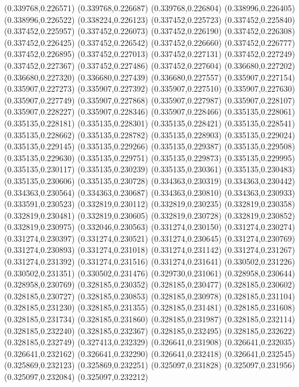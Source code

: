 (0.339768,0.226571)
(0.339768,0.226687)
(0.339768,0.226804)
(0.338996,0.226405)
(0.338996,0.226522)
(0.338224,0.226123)
(0.337452,0.225723)
(0.337452,0.225840)
(0.337452,0.225957)
(0.337452,0.226073)
(0.337452,0.226190)
(0.337452,0.226308)
(0.337452,0.226425)
(0.337452,0.226542)
(0.337452,0.226660)
(0.337452,0.226777)
(0.337452,0.226895)
(0.337452,0.227013)
(0.337452,0.227131)
(0.337452,0.227249)
(0.337452,0.227367)
(0.337452,0.227486)
(0.337452,0.227604)
(0.336680,0.227202)
(0.336680,0.227320)
(0.336680,0.227439)
(0.336680,0.227557)
(0.335907,0.227154)
(0.335907,0.227273)
(0.335907,0.227392)
(0.335907,0.227510)
(0.335907,0.227630)
(0.335907,0.227749)
(0.335907,0.227868)
(0.335907,0.227987)
(0.335907,0.228107)
(0.335907,0.228227)
(0.335907,0.228346)
(0.335907,0.228466)
(0.335135,0.228061)
(0.335135,0.228181)
(0.335135,0.228301)
(0.335135,0.228421)
(0.335135,0.228541)
(0.335135,0.228662)
(0.335135,0.228782)
(0.335135,0.228903)
(0.335135,0.229024)
(0.335135,0.229145)
(0.335135,0.229266)
(0.335135,0.229387)
(0.335135,0.229508)
(0.335135,0.229630)
(0.335135,0.229751)
(0.335135,0.229873)
(0.335135,0.229995)
(0.335135,0.230117)
(0.335135,0.230239)
(0.335135,0.230361)
(0.335135,0.230483)
(0.335135,0.230606)
(0.335135,0.230728)
(0.334363,0.230319)
(0.334363,0.230442)
(0.334363,0.230564)
(0.334363,0.230687)
(0.334363,0.230810)
(0.334363,0.230933)
(0.333591,0.230523)
(0.332819,0.230112)
(0.332819,0.230235)
(0.332819,0.230358)
(0.332819,0.230481)
(0.332819,0.230605)
(0.332819,0.230728)
(0.332819,0.230852)
(0.332819,0.230975)
(0.332046,0.230563)
(0.331274,0.230150)
(0.331274,0.230274)
(0.331274,0.230397)
(0.331274,0.230521)
(0.331274,0.230645)
(0.331274,0.230769)
(0.331274,0.230893)
(0.331274,0.231018)
(0.331274,0.231142)
(0.331274,0.231267)
(0.331274,0.231392)
(0.331274,0.231516)
(0.331274,0.231641)
(0.330502,0.231226)
(0.330502,0.231351)
(0.330502,0.231476)
(0.329730,0.231061)
(0.328958,0.230644)
(0.328958,0.230769)
(0.328185,0.230352)
(0.328185,0.230477)
(0.328185,0.230602)
(0.328185,0.230727)
(0.328185,0.230853)
(0.328185,0.230978)
(0.328185,0.231104)
(0.328185,0.231230)
(0.328185,0.231355)
(0.328185,0.231481)
(0.328185,0.231608)
(0.328185,0.231734)
(0.328185,0.231860)
(0.328185,0.231987)
(0.328185,0.232114)
(0.328185,0.232240)
(0.328185,0.232367)
(0.328185,0.232495)
(0.328185,0.232622)
(0.328185,0.232749)
(0.327413,0.232329)
(0.326641,0.231908)
(0.326641,0.232035)
(0.326641,0.232162)
(0.326641,0.232290)
(0.326641,0.232418)
(0.326641,0.232545)
(0.325869,0.232123)
(0.325869,0.232251)
(0.325097,0.231828)
(0.325097,0.231956)
(0.325097,0.232084)
(0.325097,0.232212)
